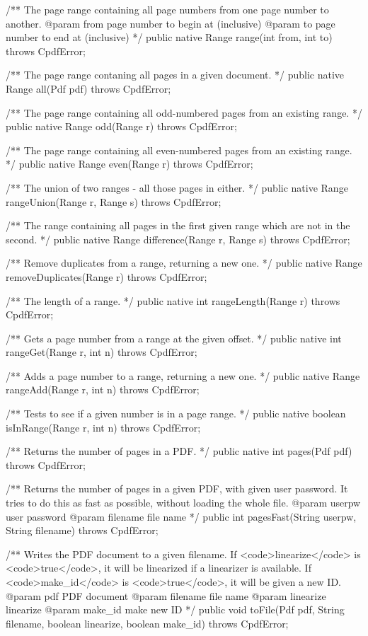 /** The page range containing all page numbers from one page number to
another.
@param from page number to begin at (inclusive)
@param to page number to end at (inclusive) */
public native Range range(int from, int to) throws CpdfError;

/** The page range contaning all pages in a given document. */
public native Range all(Pdf pdf) throws CpdfError;

/** The page range containing all odd-numbered pages from an existing
range. */
public native Range odd(Range r) throws CpdfError;

/** The page range containing all even-numbered pages from an existing
range. */
public native Range even(Range r) throws CpdfError;

/** The union of two ranges - all those pages in either. */
public native Range rangeUnion(Range r, Range s) throws CpdfError;

/** The range containing all pages in the first given range which are not
in the second. */
public native Range difference(Range r, Range s) throws CpdfError;

/** Remove duplicates from a range, returning a new one. */
public native Range removeDuplicates(Range r) throws CpdfError;

/** The length of a range. */
public native int rangeLength(Range r) throws CpdfError;

/** Gets a page number from a range at the given offset. */
public native int rangeGet(Range r, int n) throws CpdfError;

/** Adds a page number to a range, returning a new one. */
public native Range rangeAdd(Range r, int n) throws CpdfError;

/** Tests to see if a given number is in a page range. */
public native boolean isInRange(Range r, int n) throws CpdfError;

/** Returns the number of pages in a PDF. */
public native int pages(Pdf pdf) throws CpdfError;

/** Returns the number of pages in a given
PDF, with given user password. It tries to do this as fast as
possible, without loading the whole file.
@param userpw user password
@param filename file name */
public int pagesFast(String userpw, String filename) throws CpdfError;

/** Writes the PDF document to a given filename. If <code>linearize</code>
is <code>true</code>, it will be linearized if a linearizer is available.
If <code>make_id</code> is <code>true</code>, it will be given a new ID.
@param pdf PDF document
@param filename file name
@param linearize linearize
@param make_id make new ID
*/
public void toFile(Pdf pdf, String filename, boolean linearize,
                   boolean make_id)
    throws CpdfError;

